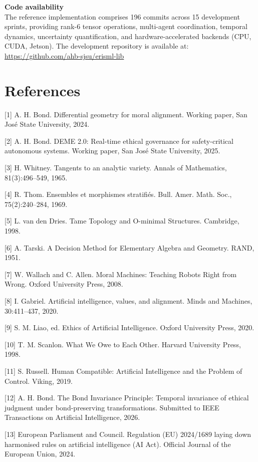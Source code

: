\documentclass[12pt]{article}
\theoremstyle{plain}
\theoremstyle{definition}
\theoremstyle{remark}
\begin{document}
\textbf{Code availability}\\
The reference implementation comprises 196 commits across 15
development sprints, providing rank-6 tensor operations, multi-agent
coordination, temporal dynamics, uncertainty quantification, and
hardware-accelerated backends (CPU, CUDA, Jetson). The development
repository is available at:
\url{https://github.com/ahb-sjsu/erisml-lib}

\section{References}\label{references}

{[}1{]} A. H. Bond. Differential geometry for moral alignment. Working
paper, San José State University, 2024.

{[}2{]} A. H. Bond. DEME 2.0: Real-time ethical governance for
safety-critical autonomous systems. Working paper, San Jos\'{e} State
University, 2025.

{[}3{]} H. Whitney. Tangents to an analytic variety. Annals of
Mathematics, 81(3):496--549, 1965.

{[}4{]} R. Thom. Ensembles et morphismes stratifiés. Bull. Amer. Math.
Soc., 75(2):240--284, 1969.

{[}5{]} L. van den Dries. Tame Topology and O-minimal Structures.
Cambridge, 1998.

{[}6{]} A. Tarski. A Decision Method for Elementary Algebra and
Geometry. RAND, 1951.

{[}7{]} W. Wallach and C. Allen. Moral Machines: Teaching Robots Right
from Wrong. Oxford University Press, 2008.

{[}8{]} I. Gabriel. Artificial intelligence, values, and alignment.
Minds and Machines, 30:411--437, 2020.

{[}9{]} S. M. Liao, ed. Ethics of Artificial Intelligence. Oxford
University Press, 2020.

{[}10{]} T. M. Scanlon. What We Owe to Each Other. Harvard University
Press, 1998.

{[}11{]} S. Russell. Human Compatible: Artificial Intelligence and the
Problem of Control. Viking, 2019.

{[}12{]} A. H. Bond. The Bond Invariance Principle: Temporal invariance
of ethical judgment under bond-preserving transformations. Submitted to
IEEE Transactions on Artificial Intelligence, 2026.

{[}13{]} European Parliament and Council. Regulation (EU) 2024/1689
laying down harmonised rules on artificial intelligence (AI Act).
Official Journal of the European Union, 2024.
\end{document}
